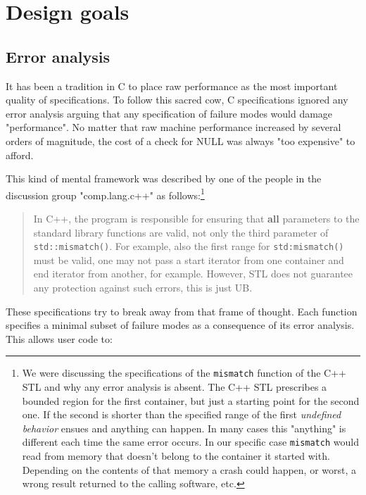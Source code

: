 \section{Design goals}
\subsection{Error analysis}
It has been a  tradition in C to place raw performance as the most important quality of specifications. To follow this sacred cow, C specifications
ignored any error analysis arguing that any specification of failure modes would damage "performance". No matter that raw machine performance
increased by several orders of magnitude, the cost of  a check for NULL was always "too expensive" to afford.

This kind of mental framework was described by one of the people in the discussion group "comp.lang.c++" as follows:\footnote{We were discussing 
the specifications of the \texttt{mismatch} function of the C++ STL and why any error analysis is absent. The C++ STL prescribes a bounded 
region for the first container, but just a starting point for the second one. If the second is shorter than the specified range of the first
 \textsl{undefined behavior} ensues and anything can happen. In many cases this "anything" is different each time the same error occurs. In our
specific case \texttt{mismatch} would read from memory that doesn't belong to the container it started with. Depending on the contents of
that memory a crash could happen, or worst, a wrong result returned to the calling software, etc.}
\begin{quotation}
 In C++, the program is responsible for ensuring that \textbf{all} parameters to
 the standard library functions are valid, not only the third parameter of
 \texttt{std::mismatch()}. For example, also the first range for \texttt{std:mismatch()}
 must be valid, one may not pass a start iterator from one container and
 end iterator from another, for example. However, STL does not guarantee
 any protection against such errors, this is just UB.
\end{quotation}
These specifications try to break away from that frame of thought. Each function specifies a minimal subset of failure modes as a consequence of its 
error analysis. This allows user code to:
